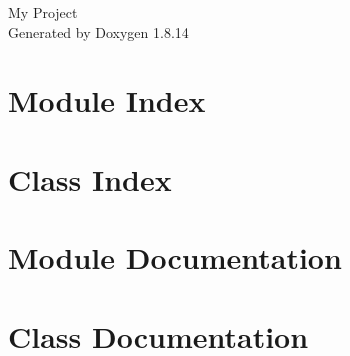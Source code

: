 \documentclass[twoside]{book}
\newcommand{\+}{\discretionary{\mbox{\scriptsize$\hookleftarrow$}}{}{}}
\newcommand{\clearemptydoublepage}{%
  \newpage{\pagestyle{empty}\cleardoublepage}%
}
\begin{document}
\hypersetup{pageanchor=false,
             bookmarksnumbered=true,
             pdfencoding=unicode
            }
\begin{titlepage}
\vspace*{7cm}
\begin{center}%
{\Large My Project }\\
\vspace*{1cm}
{\large Generated by Doxygen 1.8.14}\\
\end{center}
\end{titlepage}
\clearemptydoublepage
{}
\tableofcontents
\clearemptydoublepage
{}
\hypersetup{pageanchor=true}

\chapter{Module Index}

\chapter{Class Index}

\chapter{Module Documentation}






\chapter{Class Documentation}






















\backmatter
\newpage
{}
\clearemptydoublepage
{}
\printindex
\end{document}
